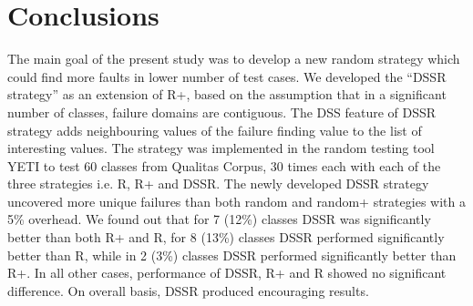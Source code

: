 

\section{Conclusions}\label{sec:conc}
The main goal of the present study was to develop a new random strategy which could find more faults in lower number of test cases. We developed the ``DSSR strategy'' as an extension of R+, based on the assumption that in a significant number of classes, failure domains are contiguous. The DSS feature of DSSR strategy adds neighbouring values of the failure finding value to the list of interesting values. The strategy was implemented in the random testing tool YETI to test 60 classes from Qualitas Corpus, 30 times each with each of the three strategies i.e. R, R+ and DSSR. The newly developed DSSR strategy uncovered more unique failures than both random and random+ strategies with a 5\% overhead. We found out that for 7 (12\%) classes DSSR was significantly better than both R+ and R, for 8 (13\%) classes DSSR performed significantly better than R, while in 2 (3\%) classes DSSR performed significantly better than R+. In all other cases, performance of DSSR, R+ and R showed no significant difference. On overall basis, DSSR produced encouraging results. 


